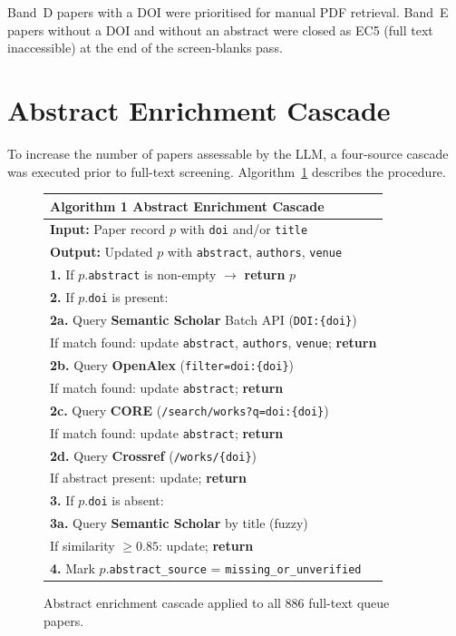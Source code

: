 Band~D papers with a DOI were prioritised for manual PDF retrieval. Band~E
papers without a DOI and without an abstract were closed as EC5 (full text
inaccessible) at the end of the screen-blanks pass.

\section{Abstract Enrichment Cascade}
\label{app:slr-enrichment}

To increase the number of papers assessable by the LLM, a four-source
cascade was executed prior to full-text screening.
Algorithm~\ref{alg:enrichment} describes the procedure.

\begin{figure}[htbp]
\centering
\small
\begin{tabular}{l}
\hline
\textbf{Algorithm 1} \quad Abstract Enrichment Cascade \\
\hline
\textbf{Input:} Paper record $p$ with \texttt{doi} and/or \texttt{title} \\
\textbf{Output:} Updated $p$ with \texttt{abstract}, \texttt{authors}, \texttt{venue} \\
\hline
\textbf{1.} If $p$.\texttt{abstract} is non-empty $\rightarrow$ \textbf{return} $p$ \\
\textbf{2.} If $p$.\texttt{doi} is present: \\
\quad\textbf{2a.} Query \textbf{Semantic Scholar} Batch API (\texttt{DOI:\{doi\}}) \\
\quad\quad If match found: update \texttt{abstract}, \texttt{authors}, \texttt{venue}; \textbf{return} \\
\quad\textbf{2b.} Query \textbf{OpenAlex} (\texttt{filter=doi:\{doi\}}) \\
\quad\quad If match found: update \texttt{abstract}; \textbf{return} \\
\quad\textbf{2c.} Query \textbf{CORE} (\texttt{/search/works?q=doi:\{doi\}}) \\
\quad\quad If match found: update \texttt{abstract}; \textbf{return} \\
\quad\textbf{2d.} Query \textbf{Crossref} (\texttt{/works/\{doi\}}) \\
\quad\quad If abstract present: update; \textbf{return} \\
\textbf{3.} If $p$.\texttt{doi} is absent: \\
\quad\textbf{3a.} Query \textbf{Semantic Scholar} by title (fuzzy) \\
\quad\quad If similarity $\geq 0.85$: update; \textbf{return} \\
\textbf{4.} Mark $p$.\texttt{abstract\_source} = \texttt{missing\_or\_unverified} \\
\hline
\end{tabular}
\caption{Abstract enrichment cascade applied to all 886 full-text queue papers.}
\label{alg:enrichment}
\end{figure}

